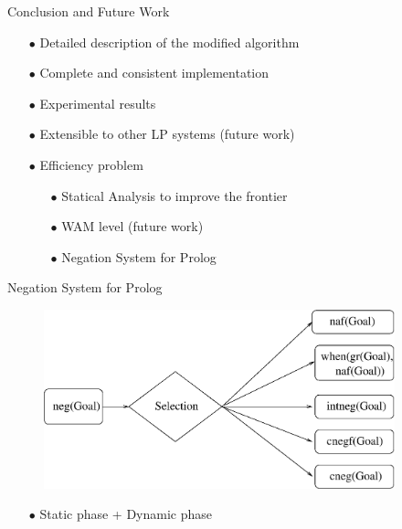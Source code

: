 \documentclass[pdf,slideColor,contemporain]{prosper}
\begin{document}
\begin{slide}{Conclusion and Future Work}

        \begin{itemize}
                \item[{\blue $\bullet$}] Detailed description of the modified {\blue algorithm}
                \item[{\blue $\bullet$}] Complete and consistent {\blue implementation}
                \item[{\blue $\bullet$}] Experimental {\blue results}
                \item[$\bullet$] {\blue Extensible} to other LP systems  
                                 (future work)
\vspace{0.3cm}
                \item[$\bullet$] {\blue Efficiency} problem
                  \begin{itemize}
                  \item[{\blue $\bullet$}] Statical Analysis to improve the frontier
                  \item[{\blue $\bullet$}] WAM level (future work)
                  \item[{\blue $\bullet$}] Negation System for Prolog 
                  \end{itemize}
        \end{itemize}
\end{slide}
\begin{slide}{Negation System for Prolog}

  \begin{figure}
        \centering
        \includegraphics[width=4in]{modules.eps} 
  \end{figure}
\vspace{-0.5cm}
      \begin{itemize}
                \item[{\blue $\bullet$}] Static phase + Dynamic phase
      \end{itemize}

\end{slide}



\maketitle
\end{document}
